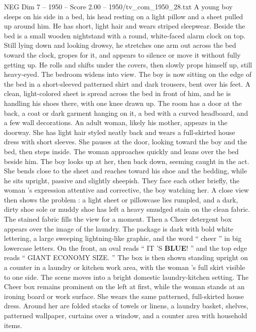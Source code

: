 \begin{textsample}{NEG Dim 7 – 1950 – Score 2.00 – 1950/tv\_com\_1950\_28.txt}  \label{ex:f7_neg_081}
A young boy sleeps on his side in a bed, his head resting on a light pillow and a sheet pulled up around him.
He has short, light hair and wears striped sleepwear.
Beside the bed is a small wooden nightstand with a round, white-faced alarm clock on top.
Still lying down and looking drowsy, he stretches one arm out across the bed toward the clock, gropes for it, and appears to silence or move it without fully getting up.
He rolls and shifts under the covers, then slowly props himself up, still heavy-eyed.
The bedroom widens into view.
The boy is now sitting on the edge of the bed in a short-sleeved patterned shirt and dark trousers, bent over his feet.
A clean, light-colored sheet is spread across the bed in front of him, and he is handling his shoes there, with one knee drawn up.
The room has a door at the back, a coat or dark garment hanging on it, a bed with a curved headboard, and a few wall decorations.
An adult woman, likely his mother, appears in the doorway.
She has light hair styled neatly back and wears a full-skirted house dress with short sleeves.
She pauses at the door, looking toward the boy and the bed, then steps inside.
The woman approaches quickly and leans over the bed beside him.
The boy looks up at her, then back down, seeming caught in the act.
She bends close to the sheet and reaches toward his shoe and the bedding, while he sits upright, passive and slightly sheepish.
They face each other briefly, the woman ’s expression attentive and corrective, the boy watching her.
A close view then shows the problem : a light sheet or pillowcase lies rumpled, and a dark, dirty shoe sole or muddy shoe has left a heavy smudged stain on the clean fabric.
The stained fabric fills the view for a moment.
Then a Cheer detergent box appears over the image of the laundry.
The package is dark with bold white lettering, a large sweeping lightning-like graphic, and the word “ cheer ” in big lowercase letters.
On the front, an oval reads “ IT ’S \textbf{BLUE}! ” and the top edge reads “ GIANT ECONOMY SIZE. ” The box is then shown standing upright on a counter in a laundry or kitchen work area, with the woman ’s full skirt visible to one side.
The scene moves into a bright domestic laundry-kitchen setting.
The Cheer box remains prominent on the left at first, while the woman stands at an ironing board or work surface.
She wears the same patterned, full-skirted house dress.
Around her are folded stacks of towels or linens, a laundry basket, shelves, patterned wallpaper, curtains over a window, and a counter area with household items.

\end{textsample}
